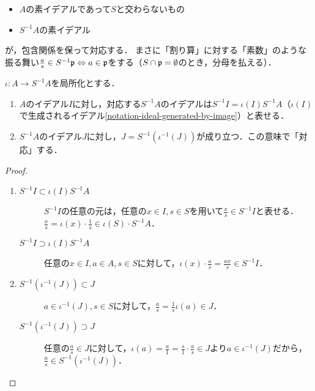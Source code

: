 \documentclass[uplatex,dvipdfmx]{jsreport}
\begin{document}
\begin{tcolorbox}[colframe=ForestGreen, colback=ForestGreen!10!white,breakable,colbacktitle=ForestGreen!40!white,coltitle=black,fonttitle=\bfseries\sffamily,
title=]
    \begin{itemize}
        \item $A$の素イデアルであって$S$と交わらないもの
        \item $S^{-1}A$の素イデアル
    \end{itemize}
    が，包含関係を保って対応する．
    まさに「割り算」に対する「素数」のような振る舞い$\frac{a}{s}\in S^{-1}\mathfrak{p}\Leftrightarrow a\in\mathfrak{p}$をする（$S\cap\mathfrak{p}=\emptyset$のとき，分母を払える）．
\end{tcolorbox}

\begin{lemma}[イデアルの表現]\label{lemma-expression-of-ideal-of-localization}
    $\iota:A\to S^{-1}A$を局所化とする．
    \begin{enumerate}
        \item $A$のイデアル$I$に対し，対応する$S^{-1}A$のイデアルは$S^{-1}I=\iota(I)S^{-1}A$（$\iota(I)$で生成されるイデアル\ref{notation-ideal-generated-by-image}）と表せる．
        \item $S^{-1}A$のイデアル$J$に対し，$J=S^{-1}(\iota^{-1}(J))$が成り立つ．この意味で「対応」する．
    \end{enumerate}
\end{lemma}
\begin{proof}\mbox{}
    \begin{enumerate}
        \item \begin{description}
            \item[$S^{-1}I\subset\iota(I)S^{-1}A$] $S^{-1}I$の任意の元は，任意の$x\in I,s\in S$を用いて$\frac{x}{s}\in S^{-1}I$と表せる．$\frac{x}{s}=\iota(x)\cdot\frac{1}{s}\in\iota(S)\cdot S^{-1}A$．
            \item[$S^{-1}I\supset\iota(I)S^{-1}A$] 任意の$x\in I,a\in A,s\in S$に対して，$\iota(x)\cdot\frac{a}{s}=\frac{ax}{s}\in S^{-1}I$．
        \end{description}
        \item \begin{description}
            \item[$S^{-1}(\iota^{-1}(J))\subset J$] $a\in\iota^{-1}(J),s\in S$に対して，$\frac{a}{s}=\frac{1}{s}\iota(a)\in J$．
            \item[$S^{-1}(\iota^{-1}(J))\supset J$] 任意の$\frac{a}{s}\in J$に対して，$\iota(a)=\frac{a}{1}=\frac{s}{1}\cdot\frac{a}{s}\in J$より$a\in\iota^{-1}(J)$だから，$\frac{a}{s}\in S^{-1}(\iota^{-1}(J))$．
        \end{description}
    \end{enumerate}
\end{proof}
\end{document}
